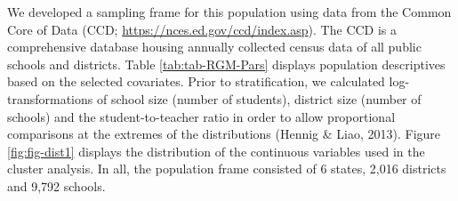 \documentclass[
  english,
  man,floatsintext]{apa6}
\begin{document}
We developed a sampling frame for this population using data from the Common Core of Data (CCD; \url{https://nces.ed.gov/ccd/index.asp}). The CCD is a comprehensive database housing annually collected census data of all public schools and districts. Table \ref{tab:tab-RGM-Pars} displays population descriptives based on the selected covariates. Prior to stratification, we calculated log-transformations of school size (number of students), district size (number of schools) and the student-to-teacher ratio in order to allow proportional comparisons at the extremes of the distributions (Hennig \& Liao, 2013). Figure \ref{fig:fig-dist1} displays the distribution of the continuous variables used in the cluster analysis. In all, the population frame consisted of 6 states, 2,016 districts and 9,792 schools.

\begin{table}[!h]


\end{table}
\end{document}

